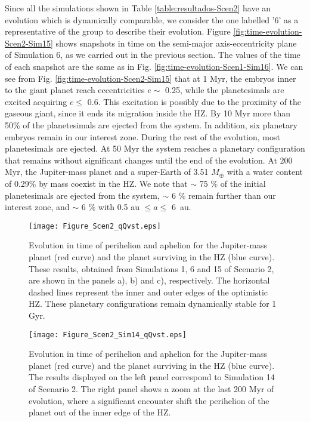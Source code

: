 \documentclass{aa}
\begin{document}
Since all the simulations shown in Table \ref{table:resultados-Scen2} have an evolution which is dynamically comparable,
we consider the one labelled '6' as a representative of the group to describe their evolution.
Figure \ref{fig:time-evolution-Scen2-Sim15} shows snapshots in time on the semi-major axis-eccentricity plane of Simulation 6,
as we carried out in the previous section. The values of the time of each snapshot are the same as in
Fig. \ref{fig:time-evolution-Scen1-Sim16}.
We can see from Fig. \ref{fig:time-evolution-Scen2-Sim15} that at 1 Myr, the embryos inner to the giant planet
reach eccentricities $e \sim$ 0.25, while the planetesimals are excited acquiring $e \leq$ 0.6.
This excitation is possibly due to the proximity of the gaseous giant, since it ends its migration inside the HZ.
By 10 Myr more than 50\% of the planetesimals are ejected
from the system. In addition, six planetary embryos remain in our interest zone. 
During the rest of the evolution, most planetesimals are ejected. At 50 Myr the system reaches a planetary configuration that remains
without significant changes until the end of the evolution. At 200 Myr, the Jupiter-mass planet
and a super-Earth of 3.51 $M_{\oplus}$ with a water content of 0.29\% by mass coexist in the HZ. We note that $\sim$ 75 $\%$ 
of the initial planetesimals are ejected from the system, $\sim$ 6 $\%$ remain further than our interest zone, and $\sim$ 6 $\%$ with 
0.5 au $\leq a \leq$ 6~au.

\begin{figure*}[htb!]
 \texttt{[image: Figure\_Scen2\_qQvst.eps]}
 \caption{
 Evolution in time of perihelion and aphelion for the Jupiter-mass planet (red curve) and the planet surviving in the HZ (blue curve).
 These results, obtained from Simulations 1, 6 and 15 of Scenario 2, are shown in the panels a), b) and c), respectively. The horizontal
 dashed lines represent the inner and outer edges of the optimistic HZ. These planetary configurations remain dynamically stable for 1 Gyr.}
\label{fig:qQ_vs_t_Scen2}
\end{figure*}

\begin{figure*}[htb!]
 \texttt{[image: Figure\_Scen2\_Sim14\_qQvst.eps]}
  \caption{
 Evolution in time of perihelion and aphelion for the Jupiter-mass planet (red curve) and the planet surviving in the HZ (blue curve).
 The results displayed on the left panel correspond to Simulation 14 of Scenario 2. The right panel shows a zoom at the last 200 Myr
 of evolution, where a significant encounter shift the perihelion of the planet out of the inner edge of the HZ.}
\label{fig:qQ_vs_t_Scen2_Sim14}
\end{figure*}
\end{document}
